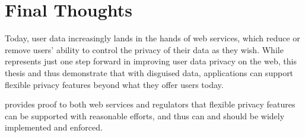 %
%
%
\section{Final Thoughts}
Today, user data increasingly lands in the hands of web services, which reduce
or remove users' ability to control the privacy of their data as they wish.
%
While \sys represents just one step forward in improving user data privacy on
the web, this thesis and \sys thus demonstrate that with disguised data,
applications can support flexible privacy features beyond what they offer users
today.


\sys provides proof to both web services and regulators that flexible
privacy features can be supported with reasonable efforts, and thus can and
should be widely implemented and enforced.
%
